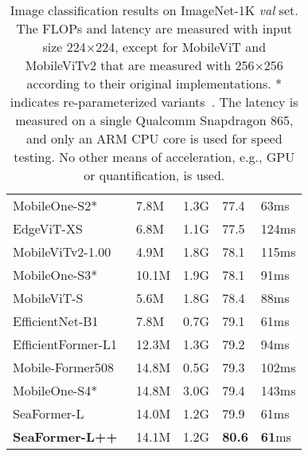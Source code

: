 \begin{table}
\begin{tabular}{L{4.0cm}|C{1.5cm}|C{1.5cm}|C{1.5cm}|C{1.5cm}}
\hline
\hline
MobileOne-S2*~\cite{vasu2022improved} & 7.8M & 1.3G & 77.4 & 63ms \\
EdgeViT-XS~\cite{pan2022edgevits} & 6.8M & 1.1G & 77.5  & 124ms \\
MobileViTv2-1.00~\cite{mehta2022separable} & 4.9M & 1.8G & 78.1 & 115ms \\
MobileOne-S3*~\cite{vasu2022improved} & 10.1M & 1.9G & 78.1 & 91ms \\
MobileViT-S~\cite{mehta2021mobilevit} & 5.6M & 1.8G & 78.4 & 88ms \\
EfficientNet-B1~\cite{tan2019efficientnet} & 7.8M & 0.7G & 79.1 & 61ms \\
EfficientFormer-L1~\cite{li2022efficientformer} & 12.3M & 1.3G & 79.2 & 94ms \\
Mobile-Former508~\cite{chen2022mobile}  & 14.8M & 0.5G & 79.3 & 102ms \\
MobileOne-S4*~\cite{vasu2022improved} & 14.8M & 3.0G & 79.4 & 143ms \\
SeaFormer-L & 14.0M & 1.2G & 79.9 & 61ms \\ 
\textbf{SeaFormer-L++} & 14.1M & 1.2G & \textbf{80.6} & \textbf{61}ms \\ 
\hline

\hline

\hline
\end{tabular}
\caption{Image classification results on ImageNet-1K \textit{val} set. The FLOPs and latency are measured with input size 224×224, except for MobileViT and MobileViTv2 that are measured with 256×256 according to their original implementations. * indicates re-parameterized variants~\cite{vasu2022improved}. The latency is measured on a single Qualcomm Snapdragon 865, and only an ARM CPU core is used for speed testing. No other means of acceleration, e.g., GPU or quantification, is used.}
\label{imagenet_table}
\end{table}